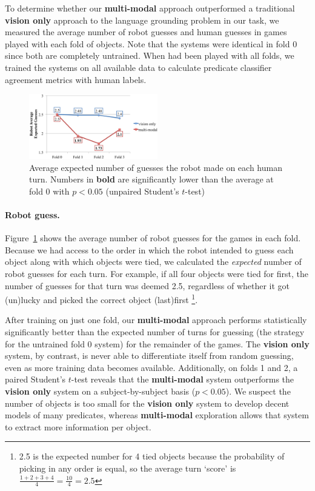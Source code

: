 To determine whether our \textbf{multi-modal} approach outperformed a traditional \textbf{vision only} approach to the language grounding problem in our \ispy task, we measured the average number of robot guesses and human guesses in games played with each fold of objects.
Note that the systems were identical in fold 0 since both are completely untrained.
When \ispy had been played with all folds, we trained the systems on all available data to calculate predicate classifier agreement metrics with human labels.

\begin{figure}
\centering
\includegraphics[width=0.5\textwidth]{figures/robot_guesses.png}
\caption{Average expected number of guesses the robot made on each human turn. Numbers in \textbf{bold} are significantly lower than the average at fold 0 with $p<0.05$ (unpaired Student's $t$-test)}
\label{fig:robot_guesses}
\end{figure}

\paragraph{Robot guess.}
Figure~\ref{fig:robot_guesses} shows the average number of robot guesses for the games in each fold. Because we had access to the order in which the robot intended to guess each object along with which objects were tied, we calculated the {\it expected} number of robot guesses for each turn.
For example, if all four objects were tied for first, the number of guesses for that turn was deemed 2.5, regardless of whether it got (un)lucky and picked the correct object (last)first
\footnote{2.5 is the expected number for 4 tied objects because the probability of picking in any order is equal, so the average turn `score' is $\frac{1+2+3+4}{4} = \frac{10}{4} = 2.5$}.

After training on just one fold, our \textbf{multi-modal} approach performs statistically significantly better than the expected number of turns for guessing (the strategy for the untrained fold 0 system) for the remainder of the games.
The \textbf{vision only} system, by contrast, is never able to differentiate itself from random guessing, even as more training data becomes available.
Additionally, on folds 1 and 2, a paired Student's $t$-test reveals that the \textbf{multi-modal} system outperforms the \textbf{vision only} system on a subject-by-subject basis ($p<0.05$).
We suspect the number of objects is too small for the \textbf{vision only} system to develop decent models of many predicates, whereas \textbf{multi-modal} exploration allows that system to extract more information per object.

